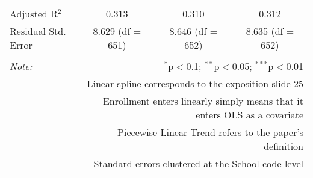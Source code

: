 \begin{table}[!htbp]
\begin{tabular}{@{\extracolsep{5pt}}lccc}
Adjusted R$^{2}$ & 0.313 & 0.310 & 0.312 \\ 
Residual Std. Error & 8.629 (df = 651) & 8.646 (df = 652) & 8.635 (df = 652) \\ 
\hline 
\hline \\[-1.8ex] 
\textit{Note:}  & \multicolumn{3}{r}{$^{*}$p$<$0.1; $^{**}$p$<$0.05; $^{***}$p$<$0.01} \\ 
 & \multicolumn{3}{r}{Linear spline corresponds to the exposition slide 25} \\ 
 & \multicolumn{3}{r}{Enrollment enters linearly simply means that it enters OLS as a covariate} \\ 
 & \multicolumn{3}{r}{Piecewise Linear Trend refers to the paper's definition} \\ 
 & \multicolumn{3}{r}{Standard errors clustered at the School code level} \\ 
\end{tabular} 
\end{table} 
